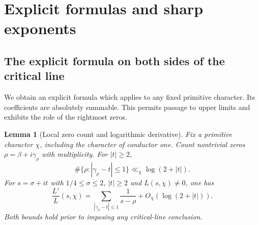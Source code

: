 \documentclass[a4paper,11pt]{article}
\newtheorem{lemma}[proposition]{Lemma}
\theoremstyle{definition}
\theoremstyle{remark}
\numberwithin{equation}{section}
\begin{document}
\section{Explicit formulas and sharp exponents}\label{nav:I-07}
\label{sect:sharp}

\subsection{The explicit formula on both sides of the critical line}\label{nav:I-08}
\label{sec:sharp}
We obtain an explicit formula which applies to any fixed primitive character. Its coefficients are absolutely summable. This permits passage to upper limits and exhibits the role of the rightmost zeros.

\begin{lemma}[Local zero count and logarithmic derivative]\label{lem:logder}
Fix a primitive character \(\chi\), including the character of conductor one. Count nontrivial zeros \(\rho=\beta+i\gamma_\rho\) with multiplicity. For \(|t|\ge2\),
\[
 \#\{\rho:|\gamma_\rho-t|\le1\}\ll_\chi\log(2+|t|).
\]
For \(s=\sigma+it\) with \(1/4\le\sigma\le2\), \(|t|\ge2\) and \(L(s,\chi)\ne0\), one has
\[
 \frac{L'}{L}(s,\chi)=
       \sum_{|\gamma_\rho-t|\le1}\frac1{s-\rho}
                           +O_\chi(\log(2+|t|)).
\]
Both bounds hold prior to imposing any critical-line conclusion.
\end{lemma}
\end{document}

